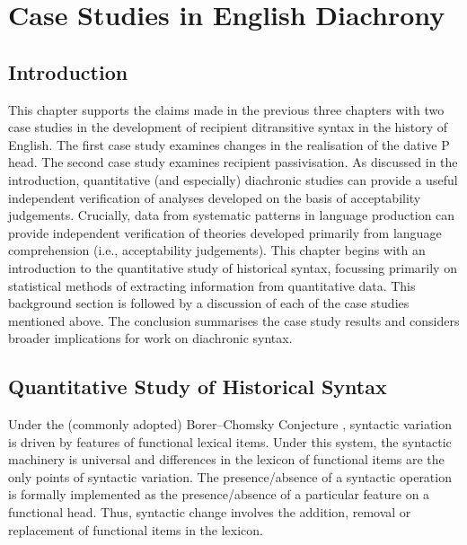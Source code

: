 \chapter{Case Studies in English Diachrony}\label{ch:diachron}
\section{Introduction}
This chapter supports the claims made in the previous three chapters with two case studies in the development of recipient ditransitive syntax in the history of English. The first case study examines changes in the realisation of the dative P head. The second case study examines recipient passivisation. As discussed in the introduction, quantitative (and especially) diachronic studies can provide a useful independent verification of analyses developed on the basis of acceptability judgements. Crucially, data from systematic patterns in language production can provide independent verification of theories developed primarily from language comprehension (i.e., acceptability judgements). This chapter begins with an introduction to the quantitative study of historical syntax, focussing primarily on statistical methods of extracting information from quantitative data. This background section is followed by a discussion of each of the case studies mentioned above. The conclusion summarises the case study results and considers broader implications for work on diachronic syntax.

\section{Quantitative Study of Historical Syntax}\label{sec:log-reg}
	Under the (commonly adopted) Borer--Chomsky Conjecture \citep{Baker.2008}, syntactic variation is driven by features of functional lexical items. Under this system, the syntactic machinery is universal and differences in the lexicon of functional items are the only points of syntactic variation. The presence/absence of a syntactic operation is formally implemented as the presence/absence of a particular feature on a functional head. Thus, syntactic change involves the addition, removal or replacement of functional items in the lexicon.

